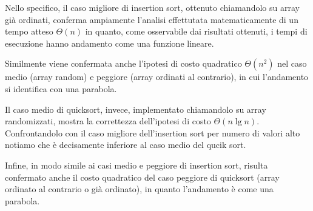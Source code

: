 \documentclass{article}
\begin{document}
Nello specifico, il caso migliore di insertion sort, ottenuto chiamandolo su array già ordinati, conferma ampiamente l'analisi effettutata matematicamente di un tempo atteso  $\Theta(n)$ in quanto, come osservabile dai risultati ottenuti, i tempi di esecuzione hanno andamento come una funzione lineare.

Similmente viene confermata anche l'ipotesi di costo quadratico $\Theta(n^2)$ nel caso medio (array random) e peggiore (array ordinati al contrario), in cui l'andamento si identifica con una parabola.

Il caso medio di quicksort, invece, implementato chiamandolo su array randomizzati, mostra la correttezza dell'ipotesi di costo $\Theta(n\lg n)$. Confrontandolo con il caso migliore dell'insertion sort per numero di valori alto notiamo che è decisamente inferiore al caso medio del qucik sort.

Infine, in modo simile ai casi medio e peggiore di insertion sort, risulta confermato anche il costo quadratico del caso peggiore di quicksort (array ordinato al contrario o già ordinato), in quanto l'andamento è come una parabola. 
\end{document}
